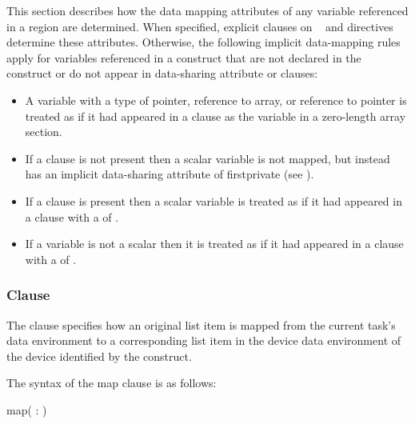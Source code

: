 This section describes how the data mapping attributes of any variable 
referenced in a  region are determined. When specified, 
explicit  clauses on ~ and  
directives determine these attributes. Otherwise, the following implicit 
data-mapping rules apply for variables referenced in a 
construct that are not declared in the construct or do not appear in 
data-sharing attribute or  clauses:

\begin{itemize}
\ccppspecificstart
\item A variable with a type of pointer, reference to array, or reference 
to pointer is treated as if it had appeared in a  clause as the 
variable in a zero-length array section.
\ccppspecificend

\item If a  clause is not present then 
a scalar variable is not mapped, but instead has an implicit data-sharing 
attribute of firstprivate (see 
).

\item If a  clause is present then a scalar 
variable is treated as if it had appeared in a  clause with a 
 of .

\item If a  variable is not a scalar then it is treated as if it had appeared 
in a  clause with a  of .
\end{itemize}


\subsubsection{ Clause}
\label{subsec:map Clause}
\summary
The  clause specifies how an original list item is mapped from the current task's data environment to a corresponding list item in the device data environment of the device identified by the construct.

\syntax
The syntax of the map clause is as follows:

\begin{boxedcode}
map(\plc{[ [map-type-modifier[,]] map-type} : \plc{] list})
\end{boxedcode}

